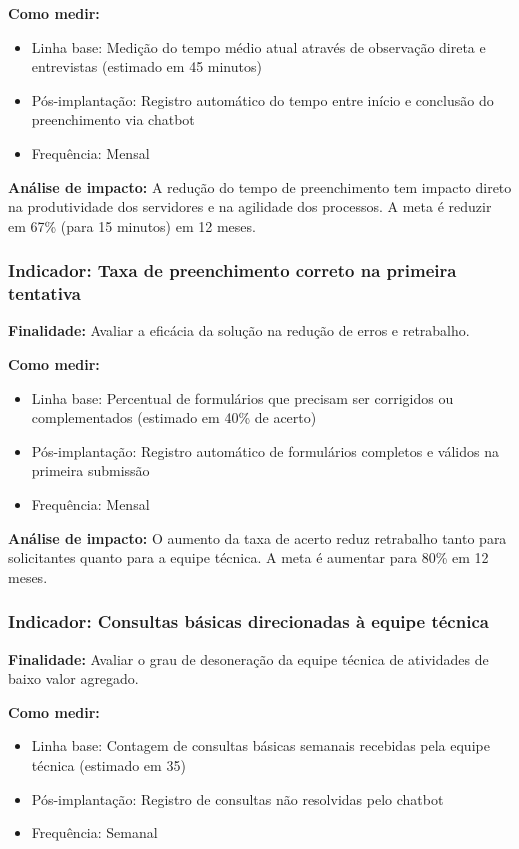 \documentclass[12pt,a4paper]{article}
\begin{document}
\textbf{Como medir:} 
\begin{itemize}
    \item Linha base: Medição do tempo médio atual através de observação direta e entrevistas (estimado em 45 minutos)
    \item Pós-implantação: Registro automático do tempo entre início e conclusão do preenchimento via chatbot
    \item Frequência: Mensal
\end{itemize}

\textbf{Análise de impacto:} A redução do tempo de preenchimento tem impacto direto na produtividade dos servidores e na agilidade dos processos. A meta é reduzir em 67\% (para 15 minutos) em 12 meses.

\subsubsection{Indicador: Taxa de preenchimento correto na primeira tentativa}

\textbf{Finalidade:} Avaliar a eficácia da solução na redução de erros e retrabalho.

\textbf{Como medir:} 
\begin{itemize}
    \item Linha base: Percentual de formulários que precisam ser corrigidos ou complementados (estimado em 40\% de acerto)
    \item Pós-implantação: Registro automático de formulários completos e válidos na primeira submissão
    \item Frequência: Mensal
\end{itemize}

\textbf{Análise de impacto:} O aumento da taxa de acerto reduz retrabalho tanto para solicitantes quanto para a equipe técnica. A meta é aumentar para 80\% em 12 meses.

\subsubsection{Indicador: Consultas básicas direcionadas à equipe técnica}

\textbf{Finalidade:} Avaliar o grau de desoneração da equipe técnica de atividades de baixo valor agregado.

\textbf{Como medir:} 
\begin{itemize}
    \item Linha base: Contagem de consultas básicas semanais recebidas pela equipe técnica (estimado em 35)
    \item Pós-implantação: Registro de consultas não resolvidas pelo chatbot
    \item Frequência: Semanal
\end{itemize}
\end{document}
